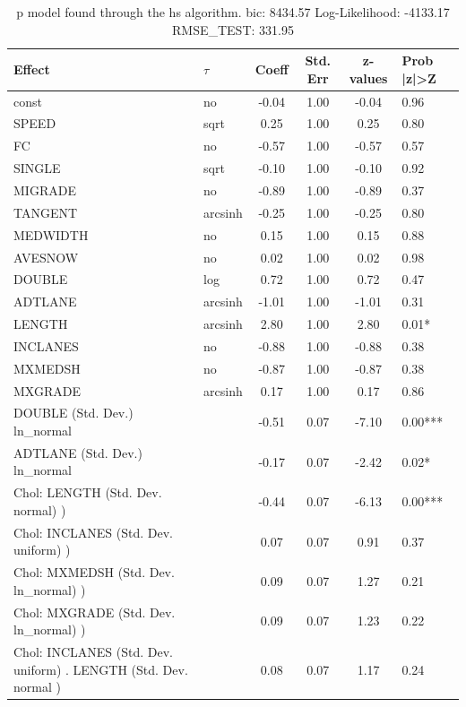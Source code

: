 \begin{table}
	\caption{p model found through the hs algorithm. bic: 8434.57 Log-Likelihood: -4133.17 RMSE_TEST: 331.95}
	\begin{center}
		\begin{tabular}{|l|l|c|c|c|l|}
			\hline
			Effect & $\tau$ & Coeff & Std. Err & z-values & Prob |z|>Z \\
			\hline
			const & no & -0.04 & 1.00 & -0.04 & 0.96 \\
			\hline
			SPEED & sqrt & 0.25 & 1.00 & 0.25 & 0.80 \\
			\hline
			FC & no & -0.57 & 1.00 & -0.57 & 0.57 \\
			\hline
			SINGLE & sqrt & -0.10 & 1.00 & -0.10 & 0.92 \\
			\hline
			MIGRADE & no & -0.89 & 1.00 & -0.89 & 0.37 \\
			\hline
			TANGENT & arcsinh & -0.25 & 1.00 & -0.25 & 0.80 \\
			\hline
			MEDWIDTH & no & 0.15 & 1.00 & 0.15 & 0.88 \\
			\hline
			AVESNOW & no & 0.02 & 1.00 & 0.02 & 0.98 \\
			\hline
			DOUBLE & log & 0.72 & 1.00 & 0.72 & 0.47 \\
			\hline
			ADTLANE & arcsinh & -1.01 & 1.00 & -1.01 & 0.31 \\
			\hline
			LENGTH & arcsinh & 2.80 & 1.00 & 2.80 & 0.01* \\
			\hline
			INCLANES & no & -0.88 & 1.00 & -0.88 & 0.38 \\
			\hline
			MXMEDSH & no & -0.87 & 1.00 & -0.87 & 0.38 \\
			\hline
			MXGRADE & arcsinh & 0.17 & 1.00 & 0.17 & 0.86 \\
			\hline
			DOUBLE (Std. Dev.) ln_normal &  & -0.51 & 0.07 & -7.10 & 0.00*** \\
			\hline
			ADTLANE (Std. Dev.) ln_normal &  & -0.17 & 0.07 & -2.42 & 0.02* \\
			\hline
			 Chol: LENGTH (Std. Dev. normal) ) &  & -0.44 & 0.07 & -6.13 & 0.00*** \\
			\hline
			 Chol: INCLANES (Std. Dev. uniform) ) &  & 0.07 & 0.07 & 0.91 & 0.37 \\
			\hline
			 Chol: MXMEDSH (Std. Dev. ln_normal) ) &  & 0.09 & 0.07 & 1.27 & 0.21 \\
			\hline
			 Chol: MXGRADE (Std. Dev. ln_normal) ) &  & 0.09 & 0.07 & 1.23 & 0.22 \\
			\hline
			 Chol: INCLANES (Std. Dev. uniform) . LENGTH (Std. Dev.   normal ) &  & 0.08 & 0.07 & 1.17 & 0.24 \\

\end{tabular}
\end{center}
\end{table}
